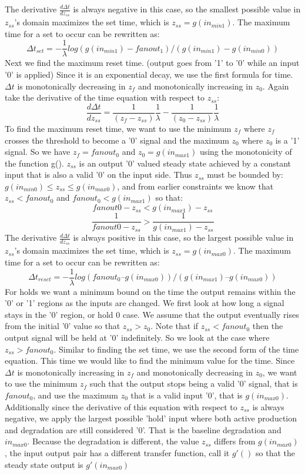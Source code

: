 \documentclass{article}
\begin{document}
The derivative $\frac{d\Delta t}{dz_{ss}}$ is always negative in this case, so the smallest possible value in $z_{ss}$'s domain maximizes the set time, which is $z_{ss}=g(in_{min1})$.
The maximum time for a set to occur can be rewritten as:
\[\Delta t_{set}= - \frac{1}{\lambda} log(g(in_{min1})-fanout_1)/(g(in_{min1}) -g(in_{min0}))
\]
Next we find the maximum reset time.  (output goes from '1' to '0' while an input '0' is applied)  Since it is an exponential decay, we use the first formula for time.  $\Delta t$ is monotonically decreasing in $z_f$ and monotonically increasing in $z_0$.  Again take the derivative of the time equation with respect to $z_{ss}$:
\[\frac{d\Delta t}{dz_{ss}}= \frac{1}{(z_f-z_{ss})}\frac{1}{\lambda}- \frac{1}{(z_0-z_{ss})}\frac{1}{\lambda}
\]
To find the maximum reset time, we want to use the minimum $z_f$ where $z_f$ crosses the threshold to become a '0' signal and the maximum $z_0$ where $z_0$ is a '1' signal.  So we have $z_f=fanout_0$ and $z_0=g(in_{max1})$ using the monotonicity of the function g().  $z_{ss}$ is an output '0' valued steady state achieved by a constant input that is also a valid '0' on the input side.  Thus $z_{ss}$ must be bounded by: $g(in_{min0})\leq z_{ss}\leq g(in_{max0})$, and from earlier constraints we know that $z_{ss}<fanout_0$ and $fanout_0<g(in_{max1})$ so that:
\[fanout0-z_{ss}< g(in_{max1})-z_{ss}
\]
\[\frac{1}{fanout0-z_{ss}}>\frac{1}{g(in_{max1})-z_{ss}}
\]
The derivative $\frac{d\Delta t}{dz_{ss}}$ is always positive in this case, so the largest possible value in $z_{ss}$'s domain maximizes the set time, which is $z_{ss}=g(in_{max0})$.
The maximum time for a set to occur can be rewritten as:
\[\Delta t_{reset}= -\frac{1}{\lambda} log(fanout_0 –g(in_{max0}))/(g(in_{max1}) – g(in_{max0}))
\]
For holds we want a minimum bound on the time the output remains within the '0' or '1' regions as the inputs are changed.  We first look at how long a signal stays in the '0' region, or hold 0 case.  We assume that the output eventually rises from the initial '0' value so that $z_{ss}>z_0$.  Note that if $z_{ss}<fanout_0$ then the output signal will be held at '0' indefinitely.  So we look at the case where $z_{ss}>fanout_0$.  Similar to finding the set time, we use the second form of the time equation.  This time we would like to find the minimum value for the time.  Since $\Delta t$ is monotonically increasing in $z_f$ and monotonically decreasing in $z_0$, we want to use the minimum $z_f$ such that the output stops being a valid '0' signal, that is $fanout_0$, and use the maximum $z_0$ that is a valid input '0', that is $g(in_{max0})$.  Additionally since the derivative of this equation with respect to $z_{ss}$ is always negative, we apply the largest possible 'hold' input where both active production and degradation are still considered '0'.  That is the baseline degradation and $in_{max0}$.  Because the degradation is different, the value $z_{ss}$ differs from $g(in_{max0})$, the input output pair has a different transfer function, call it $g'()$ so that the steady state output is $g'(in_{max0})$
\end{document}
